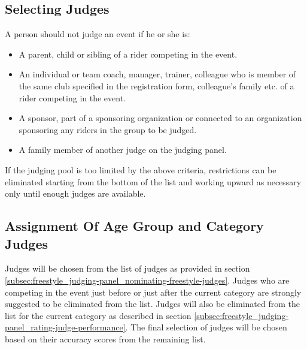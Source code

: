 \subsection{Selecting Judges \label{subsec:freestyle_judging-panel_selecting-judges}}
A person should not judge an event if he or she is:
\begin{itemize}
\item A parent, child or sibling of a rider competing in the event.
\item An individual or team coach, manager, trainer, colleague who is member of the same club specified in the registration form, colleague's family etc.
of a rider competing in the event.
\item A sponsor, part of a sponsoring organization or connected to an organization sponsoring any riders in the group to be judged.
\item A family member of another judge on the judging panel.
\end{itemize}
If the judging pool is too limited by the above criteria, restrictions can be eliminated starting from the bottom of the list and working upward as necessary only until enough judges are available.

\subsection{Assignment Of Age Group and Category Judges}
Judges will be chosen from the list of judges as provided in section \ref{subsec:freestyle_judging-panel_nominating-freestyle-judges}.
Judges who are competing in the event just before or just after the current category are strongly suggested to be eliminated from the list.
Judges will also be eliminated from the list for the current category as described in section \ref{subsec:freestyle_judging-panel_rating-judge-performance}.
The final selection of judges will be chosen based on their accuracy scores from the remaining list.

